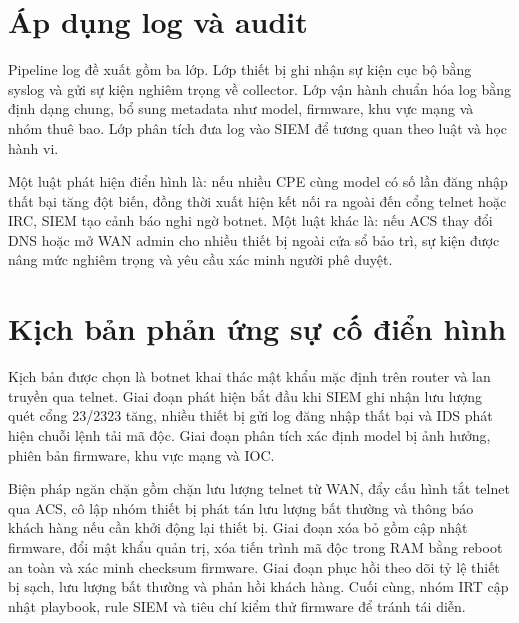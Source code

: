 \documentclass[../DoAn.tex]{subfiles}
\begin{document}
\section{Áp dụng log và audit}
Pipeline log đề xuất gồm ba lớp. Lớp thiết bị ghi nhận sự kiện cục bộ bằng syslog và gửi sự kiện nghiêm trọng về collector. Lớp vận hành chuẩn hóa log bằng định dạng chung, bổ sung metadata như model, firmware, khu vực mạng và nhóm thuê bao. Lớp phân tích đưa log vào SIEM để tương quan theo luật và học hành vi.

Một luật phát hiện điển hình là: nếu nhiều CPE cùng model có số lần đăng nhập thất bại tăng đột biến, đồng thời xuất hiện kết nối ra ngoài đến cổng telnet hoặc IRC, SIEM tạo cảnh báo nghi ngờ botnet. Một luật khác là: nếu ACS thay đổi DNS hoặc mở WAN admin cho nhiều thiết bị ngoài cửa sổ bảo trì, sự kiện được nâng mức nghiêm trọng và yêu cầu xác minh người phê duyệt.

\section{Kịch bản phản ứng sự cố điển hình}
Kịch bản được chọn là botnet khai thác mật khẩu mặc định trên router và lan truyền qua telnet. Giai đoạn phát hiện bắt đầu khi SIEM ghi nhận lưu lượng quét cổng 23/2323 tăng, nhiều thiết bị gửi log đăng nhập thất bại và IDS phát hiện chuỗi lệnh tải mã độc. Giai đoạn phân tích xác định model bị ảnh hưởng, phiên bản firmware, khu vực mạng và IOC.

Biện pháp ngăn chặn gồm chặn lưu lượng telnet từ WAN, đẩy cấu hình tắt telnet qua ACS, cô lập nhóm thiết bị phát tán lưu lượng bất thường và thông báo khách hàng nếu cần khởi động lại thiết bị. Giai đoạn xóa bỏ gồm cập nhật firmware, đổi mật khẩu quản trị, xóa tiến trình mã độc trong RAM bằng reboot an toàn và xác minh checksum firmware. Giai đoạn phục hồi theo dõi tỷ lệ thiết bị sạch, lưu lượng bất thường và phản hồi khách hàng. Cuối cùng, nhóm IRT cập nhật playbook, rule SIEM và tiêu chí kiểm thử firmware để tránh tái diễn.
\end{document}
